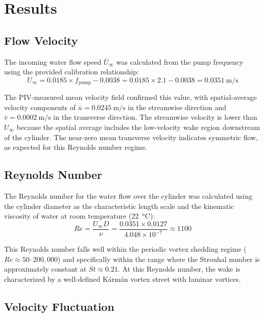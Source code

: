 \section{Results} \label{sec:results}

\subsection{Flow Velocity} \label{sec:results/flow-velocity}

The incoming water flow speed \(\bar{U}_{\infty}\) was calculated from the pump frequency using the provided calibration relationship:
\begin{equation}
    U_\infty = 0.0185 \times f_{\text{pump}} - 0.0038 = 0.0185 \times 2.1 - 0.0038 = \SI{0.0351}{\meter\per\second}
\end{equation}

The PIV-measured mean velocity field confirmed this value, with spatial-average velocity components of \(\bar{u} = \SI{0.0245}{\meter\per\second}\) in the streamwise direction and \(\bar{v} = \SI{0.0002}{\meter\per\second}\) in the transverse direction. The streamwise velocity is lower than \(U_\infty\) because the spatial average includes the low-velocity wake region downstream of the cylinder. The near-zero mean transverse velocity indicates symmetric flow, as expected for this Reynolds number regime.

\subsection{Reynolds Number} \label{sec:results/reynolds-number}

The Reynolds number for the water flow over the cylinder was calculated using the cylinder diameter as the characteristic length scale and the kinematic viscosity of water at room temperature (\SI{22}{\degreeCelsius}):
\begin{equation}
    Re = \frac{U_\infty D}{\nu} = \frac{0.0351 \times 0.0127}{4.048 \times 10^{-7}} \approx 1100
\end{equation}

This Reynolds number falls well within the periodic vortex shedding regime (\(Re \approx 50\text{--}200{,}000\)) and specifically within the range where the Strouhal number is approximately constant at \(St \approx 0.21\). At this Reynolds number, the wake is characterized by a well-defined Kármán vortex street with laminar vortices.

\subsection{Velocity Fluctuation} \label{sec:results/velocity-fluctuation}

